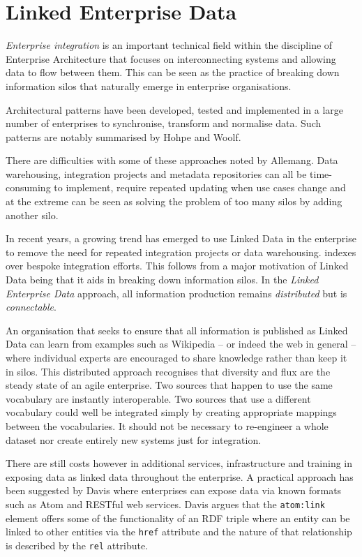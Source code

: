 \section{Linked Enterprise Data}
\label{linked-enterprise-data}

\emph{Enterprise integration} is an important technical field within the
discipline of Enterprise Architecture that focuses on interconnecting
systems and allowing data to flow between them. This can be seen as
the practice of breaking down information silos that naturally emerge
in enterprise organisations.\cite{allemang2010semantic}

Architectural patterns have been developed, tested and
implemented in a large number of enterprises to synchronise,
transform and normalise data. Such patterns are notably
summarised by Hohpe and Woolf.\cite{hohpe2004enterprise}

There are difficulties with some of these approaches noted by
Allemang\cite{allemang2010semantic}. Data warehousing,
integration projects and metadata repositories can all
be time-consuming to implement, require repeated updating when
use cases change and at the extreme can be seen as solving the
problem of too many silos by adding another silo.

In recent years, a growing trend has emerged to use
Linked Data in the enterprise to remove the need
for repeated integration projects or data warehousing.
indexes over bespoke integration efforts. This follows from
a major motivation of Linked Data being that it aids in breaking
down information silos.\cite{bizer2009linked} In the
\emph{Linked Enterprise Data} approach, all information
production remains \emph{distributed} but is
\emph{connectable}.\cite{allemang2010semantic}

An organisation that seeks to ensure that all information is
published as Linked Data can learn from examples such as Wikipedia
-- or indeed the web in general -- where individual experts are
encouraged to share knowledge rather than keep it in silos. This
distributed approach recognises that diversity and flux are the
steady state of an agile enterprise. Two sources that happen
to use the same vocabulary are instantly interoperable. Two
sources that use a different vocabulary could well be integrated
simply by creating appropriate mappings between the vocabularies.
It should not be necessary to re-engineer a whole dataset nor
create entirely new systems just for integration.

There are still costs however in additional services, infrastructure
and training in exposing data as linked data throughout the
enterprise.\cite{hyland2010preparing} A practical approach
has been suggested by Davis\cite{davis2011achieving} where enterprises
can expose data via known formats such as Atom\cite{nottingham2005atom}
and RESTful web services. Davis argues that the \texttt{atom:link}
element offers some of the functionality of an RDF triple where
an entity can be linked to other entities via the \texttt{href}
attribute and the nature of that relationship is described by
the \texttt{rel} attribute.


